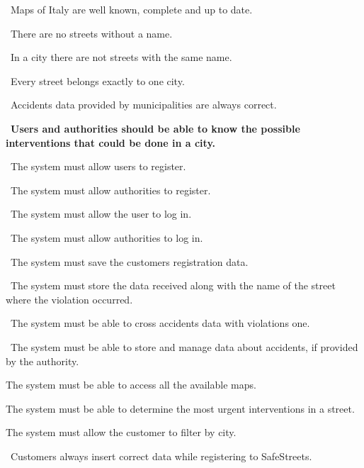 \begin{description}
\begin{description}
					\item {}\ Maps of Italy are well known, complete and up to date.
					\item {}\ There are no streets without a name.
					\item {}\ In a city there are not streets with the same name.
					\item {}\ Every street belongs exactly to one city.
					\item {}\ Accidents data provided by municipalities are always correct.
				\end{description}	
			\item {}\ \textbf{Users and authorities should be able to know the possible interventions that could be done in a city.}
				\begin{description}
					\item {}\ The system must allow users to register.
					\item {}\ The system must allow authorities to register.
					\item {}\ The system must allow the user to log in.
					\item {}\ The system must allow authorities to log in.
					\item {}\ The system must save the customers registration data.
					\item {}\ The system must store the data received along with the name of the street where the violation occurred.
					\item {}\ The system must be able to cross accidents data with violations one.
					\item {}\ The system must be able to store and manage data about accidents, if provided by the authority.
					\item {} The system must be able to access all the available maps.
					\item {} The system must be able to determine the most urgent interventions in a street.
					\item {} The system must allow the customer to filter by city.
					\item {}\ Customers always insert correct data while registering to SafeStreets.

\end{description}
\end{description}
